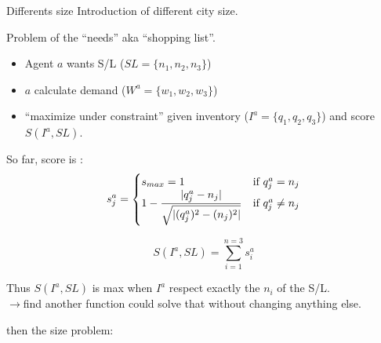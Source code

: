 \documentclass[12pt, notes=show]{beamer}
\DeclarePairedDelimiter\abs{\lvert}{\rvert}%
\begin{document}
\begin{frame}{Differents size}
    Introduction of different city size. 
    \tiny

    Problem of the ``needs'' aka ``shopping list''.
    \begin{itemize}
	\item   Agent $a$ wants S/L ($SL=\{n_1,n_2,n_3\}$)
	\item $a$ calculate demand ($W^a=\{w_1,w_2,w_3\}$)  
	\item ``maximize under constraint'' given inventory ($I^a=\{q_1,q_2,q_3\} $) and score $S(I^a,SL)$.
    \end{itemize}

    So far, score is :
\begin{equation}\label{eq:score}
s^a_j = \begin{cases}
 s_{max}=1 & \text{if $q^a_j = n_j$}\\
1 -\dfrac{\abs{q^a_j - n_j}}{ \sqrt{\abs{(q^a_j)^2-(n_j)^2}}} & \text{if $q^a_j \neq n_j$}
\end{cases}
\end{equation}

\begin{equation}
    S(I^a,SL) = \sum_{i=1}^{n=3}{s^a_i}
\end{equation}

Thus $S(I^a,SL)$  is max when $I^a$ respect exactly the $n_i$ of the S/L.\\
$\rightarrow$find another  function could solve that without changing anything else.

then the size problem:
     
     
     

\end{frame}
\end{document}
